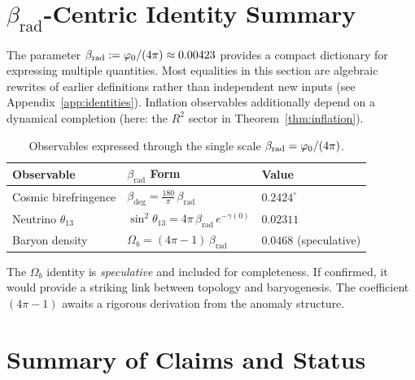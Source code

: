 \section{$\beta_{\text{rad}}$-Centric Identity Summary}

The parameter $\beta_{\text{rad}} := \varphi_0/(4\pi) \approx 0.00423$ provides a compact dictionary for expressing multiple quantities. 
Most equalities in this section are algebraic rewrites of earlier definitions rather than independent new inputs (see Appendix~\ref{app:identities}). 
Inflation observables additionally depend on a dynamical completion (here: the $R^2$ sector in Theorem~\ref{thm:inflation}).

\begin{table}[H]
\centering
\begin{tabular}{@{}lll@{}}
\toprule
\textbf{Observable} & \textbf{$\beta_{\text{rad}}$ Form} & \textbf{Value}\\
\midrule
Cosmic birefringence & $\beta_{\text{deg}} = \frac{180}{\pi}\,\beta_{\text{rad}}$ & $0.2424^\circ$\\
Neutrino $\theta_{13}$ & $\sin^2\theta_{13} = 4\pi\,\beta_{\text{rad}}\,e^{-\gamma(0)}$ & $0.02311$\\
Baryon density & $\Omega_b = (4\pi - 1)\,\beta_{\text{rad}}$ & $0.0468$ (speculative)\\
\bottomrule
\end{tabular}
\caption{Observables expressed through the single scale $\beta_{\text{rad}} = \varphi_0/(4\pi)$.}
\label{tab:beta}
\end{table}

\begin{remark}
The $\Omega_b$ identity is \emph{speculative} and included for completeness. If confirmed, 
it would provide a striking link between topology and baryogenesis. The coefficient $(4\pi - 1)$ 
awaits a rigorous derivation from the anomaly structure.
\end{remark}

\section{Summary of Claims and Status}

